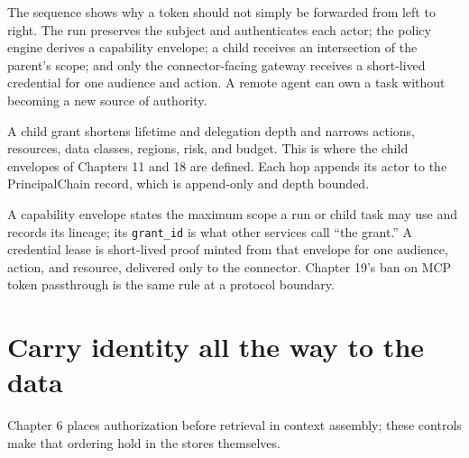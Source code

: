 The sequence shows why a token should not simply be forwarded from left to right. The run preserves the subject and authenticates each actor; the policy engine derives a capability envelope; a child receives an intersection of the parent’s scope; and only the connector-facing gateway receives a short-lived credential for one audience and action. A remote agent can own a task without becoming a new source of authority.\par

A child grant shortens lifetime and delegation depth and narrows actions, resources, data classes, regions, risk, and budget. This is where the child envelopes of Chapters 11 and 18 are defined. Each hop appends its actor to the PrincipalChain record, which is append-only and depth bounded.\par

A capability envelope states the maximum scope a run or child task may use and records its lineage; its \lstinline[style=bookinline]!grant_id! is what other services call “the grant.” A credential lease is short-lived proof minted from that envelope for one audience, action, and resource, delivered only to the connector. Chapter 19's ban on MCP token passthrough is the same rule at a protocol boundary.\par

\section{Carry identity all the way to the data}

Chapter 6 places authorization before retrieval in context assembly; these controls make that ordering hold in the stores themselves.\par

